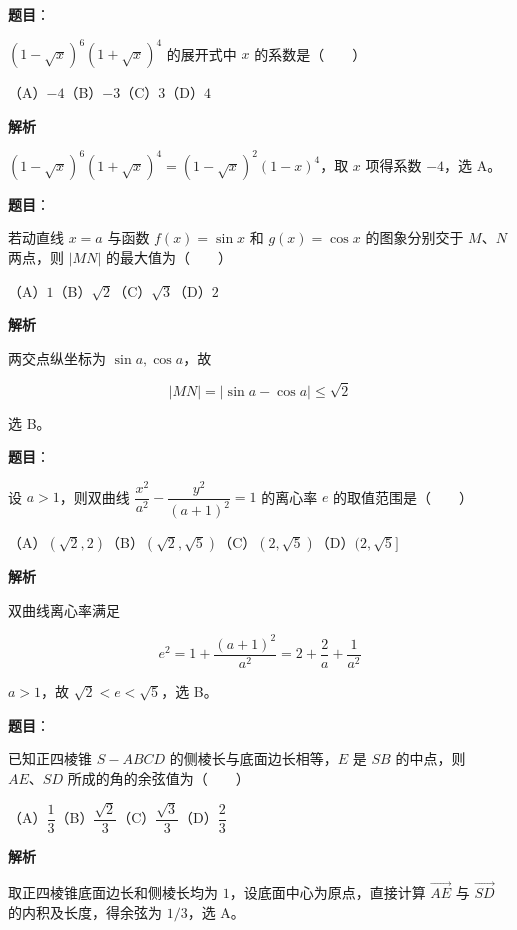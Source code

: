 \begin{answer}

\textbf{题目}：

$(1-\sqrt{x})^6(1+\sqrt{x})^4$ 的展开式中 $x$ 的系数是\mbox{（　　）}

（A）$-4$\quad（B）$-3$\quad（C）$3$\quad（D）$4$

\textbf{解析}

$(1-\sqrt x)^6(1+\sqrt x)^4=(1-\sqrt x)^2(1-x)^4$，取 $x$ 项得系数 $-4$，选 A。


\end{answer}
\begin{answer}

\textbf{题目}：

若动直线 $x=a$ 与函数 $f(x)=\sin x$ 和 $g(x)=\cos x$ 的图象分别交于 $M\text{、}N$ 两点，则 $|MN|$ 的最大值为\mbox{（　　）}

（A）$1$\quad（B）$\sqrt2$\quad（C）$\sqrt3$\quad（D）$2$

\textbf{解析}

两交点纵坐标为 $\sin a,\cos a$，故

\nopagebreak[4]
\[
|MN|=|\sin a-\cos a|\leqslant\sqrt2
\]

选 B。


\end{answer}
\begin{answer}

\textbf{题目}：

设 $a>1$，则双曲线 $\dfrac{x^2}{a^2}-\dfrac{y^2}{(a+1)^2}=1$ 的离心率 $e$ 的取值范围是\mbox{（　　）}

（A）$(\sqrt2,2)$\quad（B）$(\sqrt2,\sqrt5)$\quad（C）$(2,\sqrt5)$\quad（D）$(2,\sqrt5]$

\textbf{解析}

双曲线离心率满足

\nopagebreak[4]
\[
e^2=1+\frac{(a+1)^2}{a^2}
=2+\frac2a+\frac1{a^2}
\]

$a>1$，故 $\sqrt2<e<\sqrt5$，选 B。


\end{answer}
\begin{answer}

\textbf{题目}：

已知正四棱锥 $S-ABCD$ 的侧棱长与底面边长相等，$E$ 是 $SB$ 的中点，则 $AE\text{、}SD$ 所成的角的余弦值为\mbox{（　　）}

（A）$\dfrac13$\quad（B）$\dfrac{\sqrt2}{3}$\quad（C）$\dfrac{\sqrt3}{3}$\quad（D）$\dfrac23$

\textbf{解析}

取正四棱锥底面边长和侧棱长均为 $1$，设底面中心为原点，直接计算 $\overrightarrow{AE}$ 与 $\overrightarrow{SD}$ 的内积及长度，得余弦为 $1/3$，选 A。


\end{answer}

